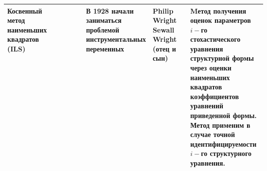 \documentclass[10pt,a4paper]{article}
\begin{document}
\begin{table}[H]
{\begin{tabular}{|m{0.15\linewidth}|m{0.17\linewidth}|Z|Y{0.1}|Y{0.18}|m{0.3\linewidth}|}
Косвенный метод \newline наименьших квадратов \newline (ILS) & &  В 1928 начали \newline заниматься \newline проблемой \newline инструментальных переменных  & Philip Wright \newline Sewall Wright \newline (отец и сын) & \includegraphics[width=0.4\linewidth]{Darth_Vader.jpg}\includegraphics[width= 0.35 \linewidth]{Sewall_Wright.jpg}  & Mетод получения оценок параметров $i-$го стохастического уравнения структурной формы через оценки наименьших квадратов коэффициентов уравнений приведенной формы. Метод применим в случае точной идентифицируемости $i-$го  структурного \newline уравнения.\\
\hline


\end{tabular}}
\end{table}
\end{document}
